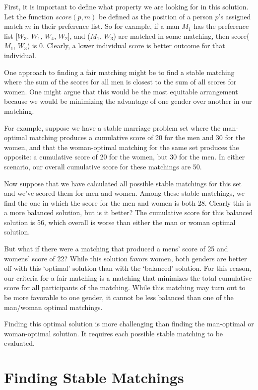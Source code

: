 \documentclass[a4paper]{article}
\begin{document}
First, it is important to define what property we are looking for in this solution. Let the function $score(p, m)$ be defined as the position of a person $p$'s assigned match $m$ in their preference list. So for example, if a man $M_1$ has the preference list [$W_3$, $W_1$, $W_4$, $W_2$], and ($M_1$, $W_3$) are matched in some matching, then score($M_1$, $W_3$) is $0$. Clearly, a lower individual score is better outcome for that individual.

One approach to finding a fair matching might be to find a stable matching where the sum of the scores for all men is closest to the sum of all scores for women. One might argue that this would be the most equitable arrangement because we would be minimizing the advantage of one gender over another in our matching.

For example, suppose we have a stable marriage problem set where the man-optimal matching produces a cumulative score of 20 for the men and 30 for the women, and that the woman-optimal matching for the same set produces the opposite: a cumulative score of 20 for the women, but 30 for the men.  In either scenario, our overall cumulative score for these matchings are 50.

Now suppose that we have calculated all possible stable matchings for this set and we've scored them for men and women. Among these stable matchings, we find the one in which the score for the men and women is both 28. Clearly this is a more balanced solution, but is it better? The cumulative score for this balanced solution is 56, which overall is worse than either the man or woman optimal solution.

But what if there were a matching that produced a mens' score of 25 and womens' score of 22? While this solution favors women, both genders are better off with this `optimal' solution than with the `balanced' solution. For this reason, our criteria for a fair matching is a matching that minimizes the total cumulative score for all participants of the matching. While this matching may turn out to be more favorable to one gender, it cannot be less balanced than one of the man/woman optimal matchings.

Finding this optimal solution is more challenging than finding the man-optimal or woman-optimal solution. It requires each possible stable matching to be evaluated.

\section{Finding Stable Matchings}
\end{document}
